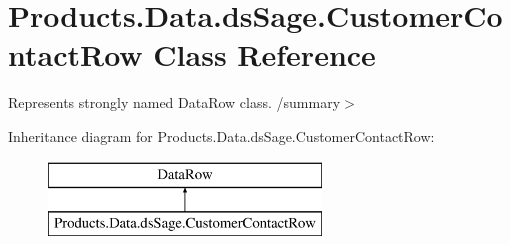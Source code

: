 \hypertarget{class_products_1_1_data_1_1ds_sage_1_1_customer_contact_row}{}\section{Products.\+Data.\+ds\+Sage.\+Customer\+Contact\+Row Class Reference}
\label{class_products_1_1_data_1_1ds_sage_1_1_customer_contact_row}


Represents strongly named Data\+Row class. /summary$>$  


Inheritance diagram for Products.\+Data.\+ds\+Sage.\+Customer\+Contact\+Row\+:\begin{figure}[H]
\begin{center}
\leavevmode
\includegraphics[height=2.000000cm]{class_products_1_1_data_1_1ds_sage_1_1_customer_contact_row}
\end{center}
\end{figure}
